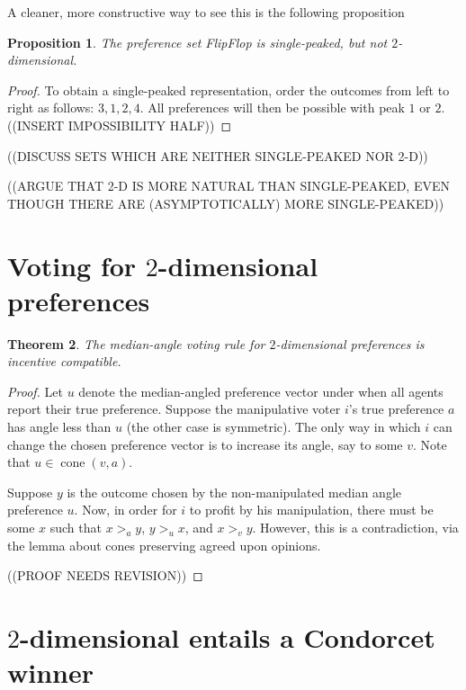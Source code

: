 \documentclass[12pt]{article}
\newtheorem{theorem}{Theorem}
\newtheorem{proposition}[theorem]{Proposition}
\DeclareMathOperator*{\cone}{cone}
\newcommand{\1}[1]{\mathds{1}[{#1}]}
\begin{document}
  A cleaner, more constructive way to see this is the following proposition
  \begin{proposition}
    The preference set {\sc FlipFlop} is single-peaked, but not
    $2$-dimensional.
  \end{proposition}
  \begin{proof}
    To obtain a single-peaked representation, order the outcomes
    from left to right as follows: $3,1,2,4$.
    All preferences will then be possible with peak $1$ or $2$.
    ((INSERT IMPOSSIBILITY HALF))
  \end{proof}

  ((DISCUSS SETS WHICH ARE NEITHER SINGLE-PEAKED NOR 2-D))

  ((ARGUE THAT 2-D IS MORE NATURAL THAN SINGLE-PEAKED,
  EVEN THOUGH THERE ARE (ASYMPTOTICALLY) MORE SINGLE-PEAKED))
\section{Voting for $2$-dimensional preferences}

  \begin{theorem}
    The median-angle voting rule for $2$-dimensional preferences
    is incentive compatible.
  \end{theorem}
  \begin{proof}
    Let $u$ denote the median-angled preference vector under when all
    agents report their true preference.
    Suppose the manipulative voter $i$'s true preference $a$
    has angle less than $u$ (the other case is symmetric).
    The only way in which $i$ can change the chosen preference vector
    is to increase its angle, say to some $v$.
    Note that $u \in \cone(v,a)$.

    Suppose $y$ is the outcome chosen by the non-manipulated median
    angle preference $u$.
    Now, in order for $i$ to profit by his manipulation,
    there must be some $x$ such that
    $x >_a y$, $y >_u x$, and $x >_v y$.
    However, this is a contradiction, via the lemma about cones
    preserving agreed upon opinions.

    ((PROOF NEEDS REVISION))
  \end{proof}

\section{$2$-dimensional entails a Condorcet winner}
\end{document}

